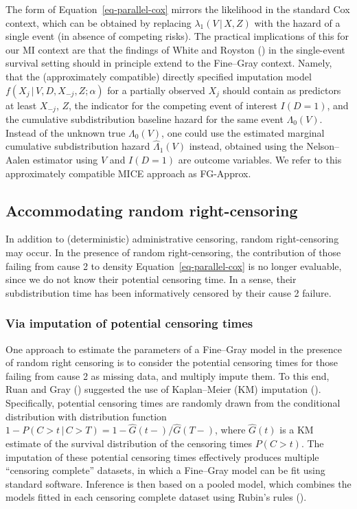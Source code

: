 \documentclass[
  letterpaper,
  DIV=11,
  numbers=noendperiod]{scrreprt}
\newcommand{\given}{\,|\,}
\begin{document}
The form of Equation~\ref{eq-parallel-cox} mirrors the likelihood in the
standard Cox context, which can be obtained by replacing
\(\lambda_1(V \given X, Z)\) with the hazard of a single event (in
absence of competing risks). The practical implications of this for our
MI context are that the findings of White and Royston
() in the
single-event survival setting should in principle extend to the
Fine--Gray context. Namely, that the (approximately compatible) directly
specified imputation model \(f(X_j \given V, D, X_{-j}, Z;\alpha)\) for
a partially observed \(X_j\) should contain as predictors at least
\(X_{-j}\), \(Z\), the indicator for the competing event of interest
\(I(D = 1)\), and the cumulative subdistribution baseline hazard for the
same event \(\Lambda_0(V)\). Instead of the unknown true
\(\Lambda_0(V)\), one could use the estimated marginal cumulative
subdistribution hazard \(\hat{\Lambda}_1(V)\) instead, obtained using
the Nelson--Aalen estimator using \(V\) and \(I(D = 1)\) are outcome
variables. We refer to this approximately compatible MICE approach as
FG-Approx.

\subsection{Accommodating random
right-censoring}\label{accommodating-random-right-censoring}

In addition to (deterministic) administrative censoring, random
right-censoring may occur. In the presence of random right-censoring,
the contribution of those failing from cause 2 to density
Equation~\ref{eq-parallel-cox} is no longer evaluable, since we do not
know their potential censoring time. In a sense, their subdistribution
time has been informatively censored by their cause 2 failure.

\subsubsection{Via imputation of potential censoring
times}\label{sec-imp-cens}

One approach to estimate the parameters of a Fine--Gray model in the
presence of random right censoring is to consider the potential
censoring times for those failing from cause 2 as missing data, and
multiply impute them. To this end, Ruan and Gray
() suggested the
use of Kaplan--Meier (KM) imputation
().
Specifically, potential censoring times are randomly drawn from the
conditional distribution with distribution function
\(1 - P(C > t \given C > T) = 1 - \hat{G}(t-)/\hat{G}(T-)\), where
\(\hat{G}(t)\) is a KM estimate of the survival distribution of the
censoring times \(P(C > t)\). The imputation of these potential
censoring times effectively produces multiple ``censoring complete''
datasets, in which a Fine--Gray model can be fit using standard
software. Inference is then based on a pooled model, which combines the
models fitted in each censoring complete dataset using Rubin's rules
().
\end{document}
